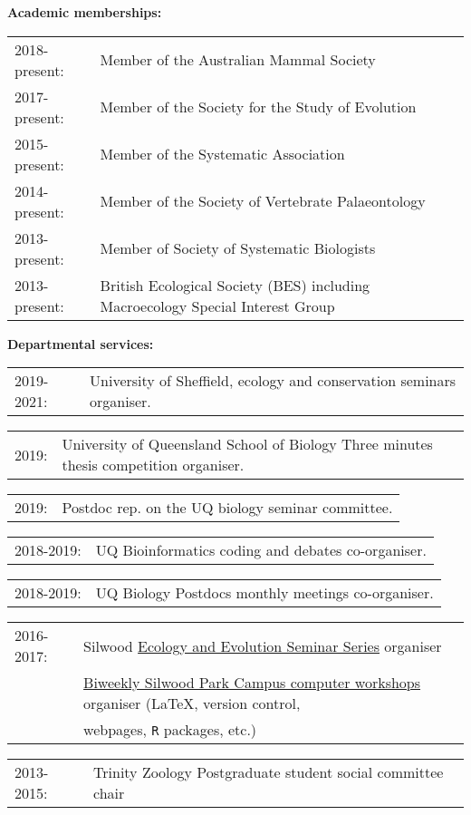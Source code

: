 \documentclass[10pt,a4paper]{article}
\begin{document}
{\raggedright\textbf{Academic memberships:}
\begin{tabular}{ll}
2018-present: & Member of the Australian Mammal Society\\ 
2017-present: & Member of the Society for the Study of Evolution\\ 
2015-present: & Member of the Systematic Association\\ 
2014-present: & Member of the Society of Vertebrate Palaeontology\\
2013-present: & Member of Society of Systematic Biologists\\
2013-present: & British Ecological Society (BES) including Macroecology Special Interest Group\\
\end{tabular}
\bigskip

\raggedright\textbf{Departmental services:}

\begin{tabular}{ll}
2019-2021: & University of Sheffield, ecology and conservation seminars organiser.\\
\end{tabular}
\begin{tabular}{ll}
2019: & University of Queensland School of Biology Three minutes thesis competition organiser.\\
\end{tabular}
\begin{tabular}{ll}
2019: & Postdoc rep. on the UQ biology seminar committee.\\
\end{tabular}
\begin{tabular}{ll}
2018-2019: & UQ Bioinformatics coding and debates co-organiser.\\
\end{tabular}
\begin{tabular}{ll}
2018-2019: & UQ Biology Postdocs monthly meetings co-organiser.\\
\end{tabular}
\begin{tabular}{ll}
2016-2017: & Silwood \href{http://www.imperial.ac.uk/silwood-park/research/thursday-seminars/}{Ecology and Evolution Seminar Series} organiser\\
    & \href{https://silwoodcomputerskillz.github.io/}{Biweekly Silwood Park Campus computer workshops} organiser (\LaTeX, version control,\\
    & webpages, \texttt{R} packages, etc.) \\
\end{tabular}
\begin{tabular}{ll}
2013-2015: & Trinity Zoology Postgraduate student social committee chair \\
\end{tabular}
\bigskip

}
\end{document}
